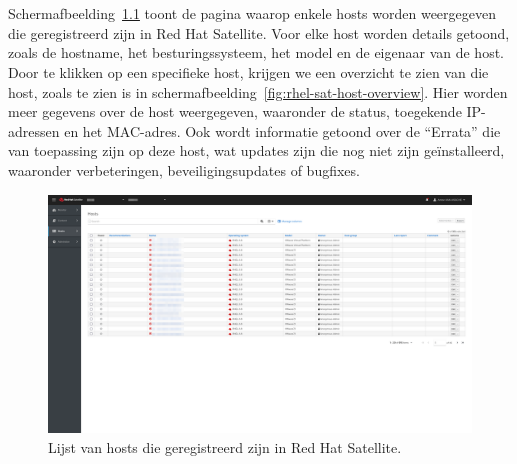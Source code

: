
\chapter{}%
\label{ch:bijlage_red_hat_satellite}

Schermafbeelding~\ref{fig:rhel-sat-hosts} toont de pagina waarop enkele hosts worden weergegeven die geregistreerd zijn in Red Hat Satellite.
Voor elke host worden details getoond, zoals de hostname, het besturingssysteem, het model en de eigenaar van de host.
Door te klikken op een specifieke host, krijgen we een overzicht te zien van die host, zoals te zien is in schermafbeelding~\ref{fig:rhel-sat-host-overview}.
Hier worden meer gegevens over de host weergegeven, waaronder de status, toegekende IP-adressen en het MAC-adres.
Ook wordt informatie getoond over de ``Errata'' die van toepassing zijn op deze host, wat updates zijn die nog niet zijn ge\"installeerd, waaronder verbeteringen, beveiligingsupdates of bugfixes.

\begin{figure}[h!]
    \includegraphics[width=\textwidth]
    {./graphics/state-of-the-art/rhel-satellite/rhel-sat-hosts.png}
    \caption{\label{fig:rhel-sat-hosts}Lijst van hosts die geregistreerd zijn in Red Hat Satellite.}
\end{figure}

